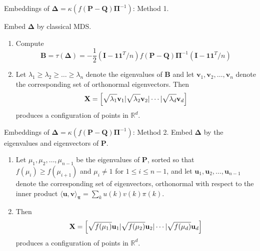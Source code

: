 \documentclass[professionalfonts,hyperref={pdfpagelabels=false,colorlinks=true,linkcolor=red}]{beamer}
\begin{document}
\begin{frame}{Embeddings of $\bm{\Delta} = \kappa(f(\mathbf{P} -
    \mathbf{Q})\bm{\Pi}^{-1})$: Method 1. }
  
  Embed $\bm{\Delta}$ by classical MDS.  
  \begin{enumerate}
  \item Compute 
    \begin{equation*}
      \mathbf{B} = \tau(\bm{\Delta}) = -\frac{1}{2}(\mathbf{I} -
      \bm{1}\bm{1}^{T}/n) f(\mathbf{P} - \mathbf{Q})\bm{\Pi}^{-1} (\mathbf{I} -
      \bm{1}\bm{1}^{T}/n)
    \end{equation*}
  \item Let $\lambda_1 \geq \lambda_2 \geq \dots \geq \lambda_n$
    denote the eigenvalues of $\mathbf{B}$ and let $\bm{v}_1,
    \bm{v}_2, \dots, \bm{v}_n$ denote the corresponding set of
    orthonormal eigenvectors. Then
    \begin{equation*}
      \mathbf{X} = \Bigl[ \sqrt{\lambda_1} \mathbf{v}_1 |
      \sqrt{\lambda_2} \mathbf{v}_{2} | \cdots |
      \sqrt{\lambda_d} \mathbf{v}_d \Bigr]
    \end{equation*}
    produces a configuration of points in $\mathbb{R}^{d}$.
  \end{enumerate}
\end{frame}
    
\begin{frame}{Embeddings of $\bm{\Delta} = \kappa(f(\mathbf{P} -
      \mathbf{Q})\bm{\Pi}^{-1})$: Method 2.}  
    Embed $\bm{\Delta}$ by the eigenvalues and eigenvectors of $\mathbf{P}$.
  \begin{enumerate}
  \item Let $\mu_1, \mu_2, \dots, \mu_{n-1}$ be the eigenvalues of
    $\mathbf{P}$, sorted so that $f(\mu_{i}) \geq f(\mu_{i+1})$ and
    $\mu_i \not= 1$ for $1 \leq i \leq n - 1$, and let $\bm{u}_1,
    \bm{u}_2, \dots, \bm{u}_{n-1}$ denote the corresponding set of
    eigenvectors, orthonormal with respect to the inner product
    $\langle
    \bm{u}, \bm{v} \rangle_{\bm{\pi}} = \sum_{k}{u(k) v(k) \pi(k)}$.
  \item Then
    \begin{equation*}
      \mathbf{X} = \Bigl[ \sqrt{f(\mu_1)} \mathbf{u}_1 |
      \sqrt{f(\mu_2)} \mathbf{u}_{2} | \cdots |
      \sqrt{f(\mu_d)} \mathbf{u}_d \Bigr]
    \end{equation*}
    produces a configuration of points in $\mathbb{R}^{d}$.
  \end{enumerate}
\end{frame}
\end{document}
